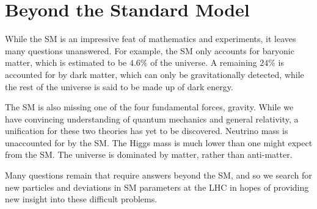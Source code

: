 \section{Beyond the Standard Model}
While the SM is an impressive feat of mathematics and experiments, it leaves many questions unanswered. For example, the SM only accounts for baryonic matter, which is estimated to be $4.6\%$ of the universe. A remaining $24\%$ is accounted for by dark matter, which can only be gravitationally detected, while the rest of the universe is said to be made up of dark energy.

The SM is also missing one of the four fundamental forces, gravity. While we have convincing understanding of quantum mechanics and general relativity, a unification for these two theories has yet to be discovered. Neutrino mass is unaccounted for by the SM. The Higgs mass is much lower than one might expect from the SM. The universe is dominated by matter, rather than anti-matter. 

Many questions remain that require answers beyond the SM, and so we search for new particles and deviations in SM parameters at the LHC in hopes of providing new insight into these difficult problems.